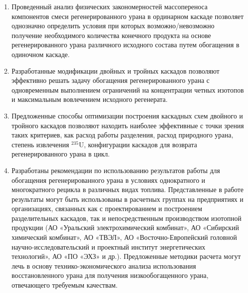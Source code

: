 {\influence} 
\begin{enumerate}
  \item Проведенный анализ физических закономерностей массопереноса компонентов смеси регенерированного урана в ординарном каскаде позволяет однозначно определить условия при которых возможно/невозможно получение необходимого количества конечного продукта на основе регенерированного урана различного исходного состава путем обогащения в одиночном каскаде.
  \item Разработанные модификации двойных и тройных каскадов позволяют эффективно решать задачу обогащения регенерированного урана с одновременным выполнением ограничений на концентрации четных изотопов и максимальным вовлечением исходного регенерата.
  \item Предложенные способы оптимизации построения каскадных схем двойного и тройного каскадов позволяют находить наиболее эффективные с точки зрения таких критериев, как расход работы разделения, расход природного урана, степень извлечения $^{235}$U, конфигурации каскадов для возврата регенерированного урана в цикл.
  \item Разработаны рекомендации по использованию результатов работы для обогащения регенерированного урана в условиях однократного и многократного рецикла в различных видах топлива. Представленные в работе результаты могут быть использованы в расчетных группах на предприятиях и организациях, связанных как с проектированием и построением разделительных каскадов, так и непосредственным производством изотопной продукции (АО «Уральский электрохимический комбинат», АО «Сибирский химический комбинат», АО «ТВЭЛ», АО «Восточно-Европейский головной научно-исследовательский и проектный институт энергетических технологий», АО «ПО «ЭХЗ» и др.). Предложенные методики расчета могут лечь в основу технико-экономического анализа использования восстановленного урана для получения низкообогащенного урана, отвечающего требуемым качествам.  
\end{enumerate}


